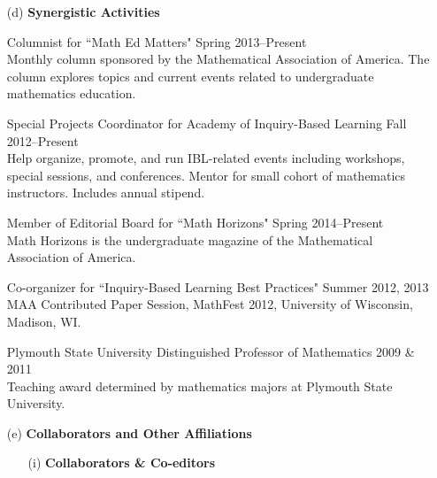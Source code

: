 \documentclass[11pt]{article}
\begin{document}
\begin{enumerate}[leftmargin=*]
\item[(d)] \textbf{Synergistic Activities}

Columnist for ``Math Ed Matters" \hfill Spring 2013--Present\\
Monthly column sponsored by the Mathematical Association of America. The column explores topics and current events related to undergraduate mathematics education. 

\vspace{.25em}

Special Projects Coordinator for Academy of Inquiry-Based Learning \hfill Fall 2012--Present\\
Help organize, promote, and run IBL-related events including workshops, special sessions, and conferences. Mentor for small cohort of mathematics instructors.  Includes annual stipend.

\vspace{.25em}

Member of Editorial Board for ``Math Horizons" \hfill Spring 2014--Present\\
Math Horizons is the undergraduate magazine of the Mathematical Association of America.

\vspace{.25em}

Co-organizer for ``Inquiry-Based Learning Best Practices" \hfill Summer 2012, 2013\\
MAA Contributed Paper Session, MathFest 2012, University of Wisconsin, Madison, WI.

\vspace{.25em}

%
 
Plymouth State University Distinguished Professor of Mathematics \hfill 2009 \& 2011\\
Teaching award determined by mathematics majors at Plymouth State University.

\item[(e)] \textbf{Collaborators and Other Affiliations} 
 
\begin{enumerate}[leftmargin=\parindent]
\item[(i)] \textbf{Collaborators \& Co-editors}


\end{enumerate}
\end{enumerate}
\end{document}
